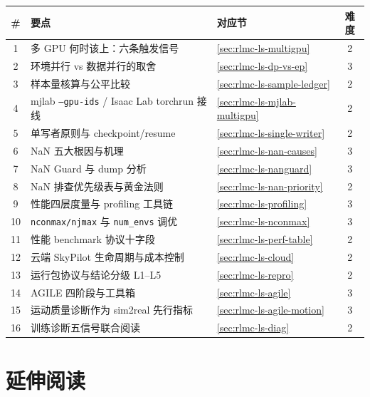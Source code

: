 \begin{table}[H]\centering\small
\begin{tabular}{@{}cp{7.6cm}p{2.6cm}c@{}}
\toprule
\# & 要点 & 对应节 & 难度 \\
\midrule
1 & 多 GPU 何时该上：六条触发信号 & \cref{sec:rlmc-ls-multigpu} & 2 \\
2 & 环境并行 vs 数据并行的取舍 & \cref{sec:rlmc-ls-dp-vs-ep} & 3 \\
3 & 样本量核算与公平比较 & \cref{sec:rlmc-ls-sample-ledger} & 2 \\
4 & mjlab \texttt{--gpu-ids} / Isaac Lab torchrun 接线 & \cref{sec:rlmc-ls-mjlab-multigpu} & 2 \\
5 & 单写者原则与 checkpoint/resume & \cref{sec:rlmc-ls-single-writer} & 2 \\
6 & NaN 五大根因与机理 & \cref{sec:rlmc-ls-nan-causes} & 3 \\
7 & NaN Guard 与 dump 分析 & \cref{sec:rlmc-ls-nanguard} & 3 \\
8 & NaN 排查优先级表与黄金法则 & \cref{sec:rlmc-ls-nan-priority} & 2 \\
9 & 性能四层度量与 profiling 工具链 & \cref{sec:rlmc-ls-profiling} & 3 \\
10 & \texttt{nconmax/njmax} 与 \texttt{num\_envs} 调优 & \cref{sec:rlmc-ls-nconmax} & 3 \\
11 & 性能 benchmark 协议十字段 & \cref{sec:rlmc-ls-perf-table} & 2 \\
12 & 云端 SkyPilot 生命周期与成本控制 & \cref{sec:rlmc-ls-cloud} & 2 \\
13 & 运行包协议与结论分级 L1--L5 & \cref{sec:rlmc-ls-repro} & 2 \\
14 & AGILE 四阶段与工具箱 & \cref{sec:rlmc-ls-agile} & 3 \\
15 & 运动质量诊断作为 sim2real 先行指标 & \cref{sec:rlmc-ls-agile-motion} & 3 \\
16 & 训练诊断五信号联合阅读 & \cref{sec:rlmc-ls-diag} & 2 \\
\bottomrule
\end{tabular}
\end{table}

\section{延伸阅读}
\label{sec:rlmc-ls-further}

